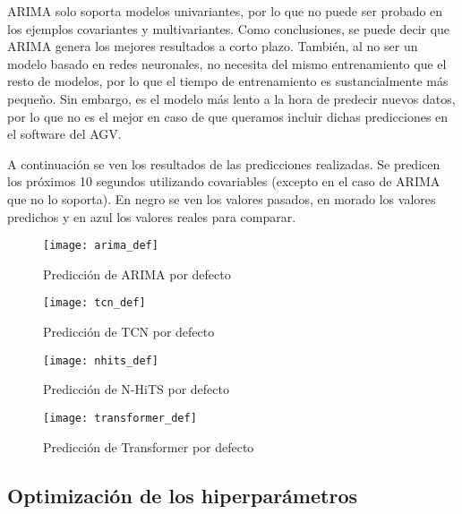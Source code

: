 ARIMA solo soporta modelos univariantes, por lo que no puede ser probado en los ejemplos covariantes y multivariantes.
Como conclusiones, se puede decir que ARIMA genera los mejores resultados a corto plazo. También, al no ser un modelo 
basado en redes neuronales, no necesita del mismo entrenamiento que el resto de modelos, por lo que el tiempo de entrenamiento 
es sustancialmente más pequeño. Sin embargo, es el modelo más lento a la hora de predecir nuevos datos, por lo que no es 
el mejor en caso de que queramos incluir dichas predicciones en el software del AGV.

A continuación se ven los resultados de las predicciones realizadas. Se predicen los próximos
10 segundos utilizando covariables (excepto en el caso de ARIMA que no lo soporta). En negro se 
ven los valores pasados, en morado los valores predichos y en azul los valores reales para comparar.

\begin{figure}[H]
    \centering
    \texttt{[image: arima\_def]}
    \caption{Predicción de ARIMA por defecto}\label{fig:arima_def}
\end{figure}

\begin{figure}[H]
    \centering
    \texttt{[image: tcn\_def]}
    \caption{Predicción de TCN por defecto}\label{fig:tcn_def}
\end{figure}

\begin{figure}[H]
    \centering
    \texttt{[image: nhits\_def]}
    \caption{Predicción de N-HiTS por defecto}\label{fig:nhits_def}
\end{figure}

\begin{figure}[H]
    \centering
    \texttt{[image: transformer\_def]}
    \caption{Predicción de Transformer por defecto}\label{fig:transformer_def}
\end{figure}

\subsection{Optimización de los hiperparámetros}

